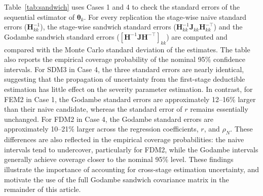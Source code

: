 \documentclass[11pt]{article}
\begin{document}
{%
Table~\ref{tab:sandwich} uses Cases 1 and 4 to check the standard errors of the sequential estimator of $\boldsymbol{\theta}_k$. For every replication the stage-wise naive standard errors ($\bm{H}_{kk}^{-1}$), the stage-wise sandwich standard errors ($\bm{H}_{kk}^{-1}\bm{J}_{kk}\bm{H}_{kk}^{-\top}$) and the Godambe sandwich standard errors ($[\bm{H}^{-1}\bm{J}\bm{H}^{-\top}]_{kk}$) are computed and compared with the Monte Carlo standard deviation of the estimates. The table also reports the empirical coverage probability of the nominal 95\% confidence intervals. For SDM3 in Case 4, the three standard errors are nearly identical, suggesting that the propagation of uncertainty from the first-stage deductible estimation has little effect on the severity parameter estimation. In contrast, for FEM2 in Case 1, the Godambe standard errors are approximately 12--16\% larger than their naive candidate, whereas the standard error of $r$ remains essentially unchanged. For FDM2 in Case 4, the Godambe standard errors are approximately 10--21\% larger across the regression coefficients, $r$, and $\rho_N$. These differences are also reflected in the empirical coverage probabilities: the naive intervals tend to undercover, particularly for FDM2, while the Godambe intervals generally achieve coverage closer to the nominal 95\% level. These findings illustrate the importance of accounting for cross-stage estimation uncertainty, and motivate the use of the full Godambe sandwich covariance matrix in the remainder of this article.

}
\end{document}
